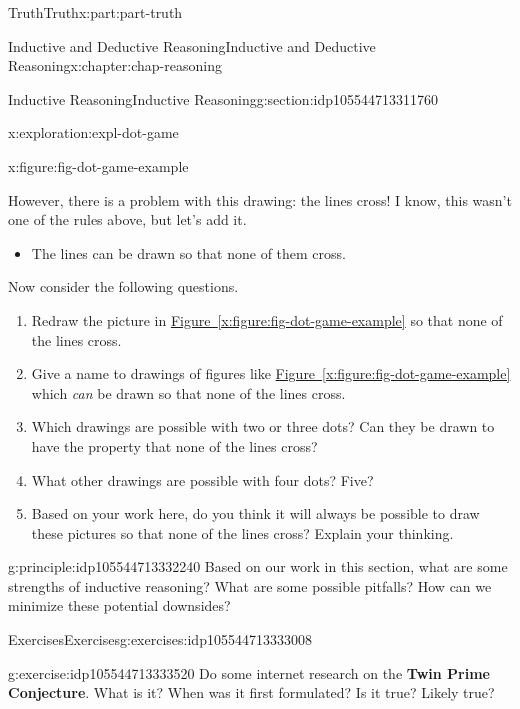 \documentclass[oneside,10pt,]{book}
\newcommand{\xreffont}{\relax}
\newcommand{\terminology}[1]{\textbf{#1}}
\numberwithin{equation}{section}
\begin{document}
\begin{partptx}{Truth}{}{Truth}{}{}{x:part:part-truth}
\begin{chapterptx}{Inductive and Deductive Reasoning}{}{Inductive and Deductive Reasoning}{}{}{x:chapter:chap-reasoning}
\begin{sectionptx}{Inductive Reasoning}{}{Inductive Reasoning}{}{}{g:section:idp105544713311760}
\begin{exploration}{}{x:exploration:expl-dot-game}
\begin{figureptx}{}{x:figure:fig-dot-game-example}{}
\begin{image}{0.325}{0.35}{0.325}
\end{image}%
\tcblower
\end{figureptx}%
However, there is a problem with this drawing: the lines cross! I know, this wasn't one of the rules above, but let's add it.%
%
\begin{itemize}[label=\textbullet]
\item{}The lines can be drawn so that none of them cross.%
\end{itemize}
Now consider the following questions.%
%
\begin{enumerate}
\item{}Redraw the picture in \hyperref[x:figure:fig-dot-game-example]{Figure~{\xreffont\ref{x:figure:fig-dot-game-example}}} so that none of the lines cross.%
\item{}Give a name to drawings of figures like \hyperref[x:figure:fig-dot-game-example]{Figure~{\xreffont\ref{x:figure:fig-dot-game-example}}} which \emph{can} be drawn so that none of the lines cross.%
\item{}Which drawings are possible with two or three dots? Can they be drawn to have the property that none of the lines cross?%
\item{}What other drawings are possible with four dots? Five?%
\item{}Based on your work here, do you think it will always be possible to draw these pictures so that none of the lines cross? Explain your thinking.%
\end{enumerate}
\end{exploration}%
\begin{principle}{}{}{g:principle:idp105544713332240}%
Based on our work in this section, what are some strengths of inductive reasoning? What are some possible pitfalls? How can we minimize these potential downsides?%
\end{principle}
%
%
\typeout{************************************************}
\typeout{************************************************}
%
\begin{exercises-subsection-numberless}{Exercises}{}{Exercises}{}{}{g:exercises:idp105544713333008}
\begin{divisionexercise}{1}{}{}{g:exercise:idp105544713333520}%
Do some internet research on the \terminology{Twin Prime Conjecture}. What is it? When was it first formulated? Is it true? Likely true?%
\end{divisionexercise}%
\end{exercises-subsection-numberless}
\end{sectionptx}

\end{chapterptx}
\end{partptx}
\end{document}
